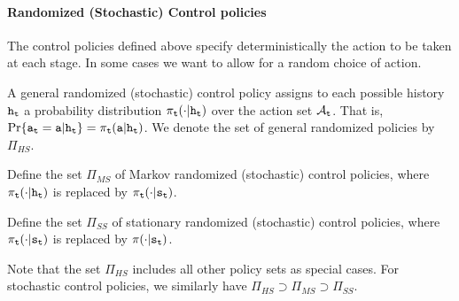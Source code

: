 \paragraph{Randomized (Stochastic) Control policies}
The control policies defined above specify deterministically the action to be taken at each stage. In some cases we want to allow for a random choice of action.

\begin{definition}
    A general randomized (stochastic) control policy assigns to each
possible history ${{\tt h}_{\tt t}}$ a probability distribution
${\pi _{\tt t}}( \cdot |{{\tt h}_{\tt t}})$ over the action set
${\mathcal{A}_{\tt t}}$. That is,  $\Pr\{ {{\tt a}_{\tt t}} =
{\tt a}|{{\tt h}_{\tt t}}\}  = {\pi
_{\tt t}}({\tt a}|{{\tt h}_{\tt t}})$. We denote the set of general
randomized policies by ${\Pi _{HS}}$.
\end{definition}
\begin{definition}
Define the set ${\Pi _{MS}}$ of Markov randomized (stochastic) control policies, where ${\pi _{\tt t}}( \cdot |{{\tt h}_{\tt t}})$ is replaced by ${\pi _{\tt t}}( \cdot |{{\tt s}_{\tt t}})$.
\end{definition}
\begin{definition}
Define the set ${\Pi _{SS}}$ of stationary randomized (stochastic) control policies, where ${\pi _{\tt t}}( \cdot |{{\tt s}_{\tt t}})$ is replaced by  $\pi ( \cdot |{{\tt s}_{\tt t}})$.
\end{definition}
Note that the set ${\Pi _{HS}}$ includes all other policy sets as special cases. For stochastic control policies, we similarly have ${\Pi _{HS}} \supset {\Pi _{MS}} \supset {\Pi _{SS}}$.



